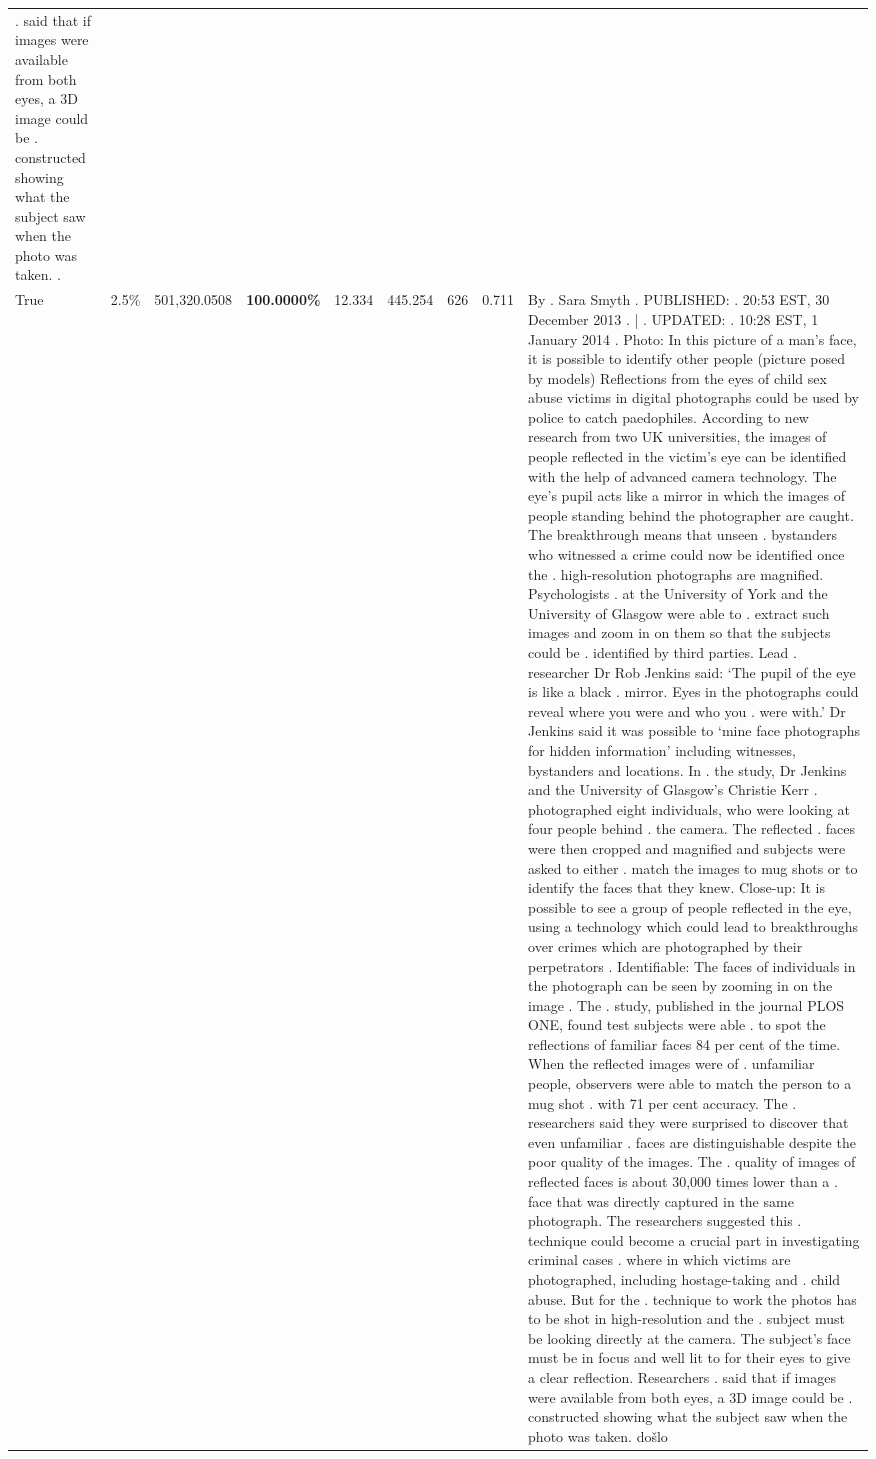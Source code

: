 \begin{table}[H]
\begin{tabular}{lllrlllll}
. said that if images were available from both eyes, a 3D image could be . constructed showing what the subject saw when the photo was taken. . \\
\cline{1-9}
True & 2.5\% & 501,320.0508 & \bfseries \color{red} 100.0000\% & 12.334 & 445.254 & 626 & 0.711 & By . Sara Smyth . PUBLISHED: . 20:53 EST, 30 December 2013 . | . UPDATED: . 10:28 EST, 1 January 2014 . Photo: In this picture of a man's face, it is possible to identify other people (picture posed by models) Reflections from the eyes of child sex abuse victims in digital photographs could be used by police to catch paedophiles. According to new research from two UK universities, the images of people reflected in the victim's eye can be identified with the help of advanced camera technology. The eye's pupil acts like a mirror in which the images of people standing behind the photographer are caught. The breakthrough means that unseen . bystanders who witnessed a crime could now be identified once the . high-resolution photographs are magnified. Psychologists . at the University of York and the University of Glasgow were able to . extract such images and zoom in on them so that the subjects could be . identified by third parties. Lead . researcher Dr Rob Jenkins said: ‘The pupil of the eye is like a black . mirror. Eyes in the photographs could reveal where you were and who you . were with.' Dr Jenkins said it was possible to ‘mine face photographs for hidden information' including witnesses, bystanders and locations. In . the study, Dr Jenkins and the University of Glasgow's Christie Kerr . photographed eight individuals, who were looking at four people behind . the camera. The reflected . faces were then cropped and magnified and subjects were asked to either . match the images to mug shots or to identify the faces that they knew. Close-up: It is possible to see a group of people reflected in the eye, using a technology which could lead to breakthroughs over crimes which are photographed by their perpetrators . Identifiable: The faces of individuals in the photograph can be seen by zooming in on the image . The . study, published in the journal PLOS ONE, found test subjects were able . to spot the reflections of familiar faces 84 per cent of the time. When the reflected images were of . unfamiliar people, observers were able to match the person to a mug shot . with 71 per cent accuracy. The . researchers said they were surprised to discover that even unfamiliar . faces are distinguishable despite the poor quality of the images. The . quality of images of reflected faces is about 30,000 times lower than a . face that was directly captured in the same photograph. The researchers suggested this . technique could become a crucial part in investigating criminal cases . where in which victims are photographed, including hostage-taking and . child abuse. But for the . technique to work the photos has to be shot in high-resolution and the . subject must be looking directly at the camera. The subject's face must be in focus and well lit to for their eyes to give a clear reflection. Researchers . said that if images were available from both eyes, a 3D image could be . constructed showing what the subject saw when the photo was taken. došlo \\

\end{tabular}
\end{table}
